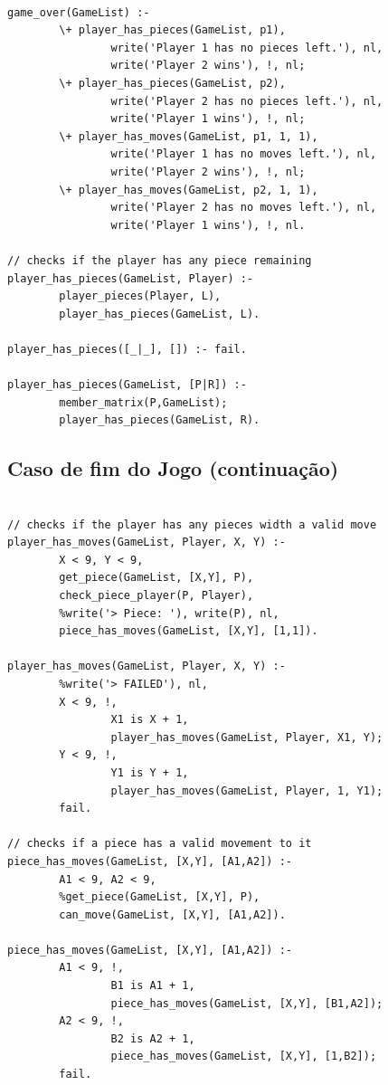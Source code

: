 \begin{lstlisting}

game_over(GameList) :-
        \+ player_has_pieces(GameList, p1),
                write('Player 1 has no pieces left.'), nl,
                write('Player 2 wins'), !, nl;
        \+ player_has_pieces(GameList, p2),
                write('Player 2 has no pieces left.'), nl,
                write('Player 1 wins'), !, nl;
        \+ player_has_moves(GameList, p1, 1, 1),
                write('Player 1 has no moves left.'), nl,
                write('Player 2 wins'), !, nl;
        \+ player_has_moves(GameList, p2, 1, 1),
                write('Player 2 has no moves left.'), nl,
                write('Player 1 wins'), !, nl.

// checks if the player has any piece remaining
player_has_pieces(GameList, Player) :-
        player_pieces(Player, L),
        player_has_pieces(GameList, L).

player_has_pieces([_|_], []) :- fail.

player_has_pieces(GameList, [P|R]) :-
        member_matrix(P,GameList);
        player_has_pieces(GameList, R).

\end{lstlisting}

\newpage

\subsection{Caso de fim do Jogo (continuação)}

\begin{lstlisting}

// checks if the player has any pieces width a valid move
player_has_moves(GameList, Player, X, Y) :-
        X < 9, Y < 9,
        get_piece(GameList, [X,Y], P),
        check_piece_player(P, Player),
        %write('> Piece: '), write(P), nl,
        piece_has_moves(GameList, [X,Y], [1,1]).

player_has_moves(GameList, Player, X, Y) :-
        %write('> FAILED'), nl,
        X < 9, !,
                X1 is X + 1,
                player_has_moves(GameList, Player, X1, Y);
        Y < 9, !,
                Y1 is Y + 1,
                player_has_moves(GameList, Player, 1, Y1);
        fail.

// checks if a piece has a valid movement to it
piece_has_moves(GameList, [X,Y], [A1,A2]) :-
        A1 < 9, A2 < 9,
        %get_piece(GameList, [X,Y], P),
        can_move(GameList, [X,Y], [A1,A2]).

piece_has_moves(GameList, [X,Y], [A1,A2]) :-
        A1 < 9, !,
                B1 is A1 + 1,
                piece_has_moves(GameList, [X,Y], [B1,A2]);
        A2 < 9, !,
                B2 is A2 + 1,
                piece_has_moves(GameList, [X,Y], [1,B2]);
        fail.

\end{lstlisting}


